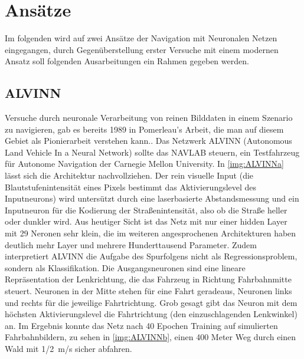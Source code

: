 \section{Ansätze}
Im folgenden wird auf zwei Ansätze der Navigation mit Neuronalen Netzen eingegangen, durch Gegenüberstellung erster Versuche mit einem modernen Ansatz soll folgenden Ausarbeitungen ein Rahmen gegeben werden.

\subsection{ALVINN}

Versuche durch neuronale Verarbeitung von reinen Bilddaten in einem Szenario zu navigieren, gab es bereits 1989 in Pomerleau's Arbeit, die man auf diesem Gebiet als Pionierarbeit verstehen kann.\cite{pomerleau1989alvinn}.
Das Netzwerk ALVINN (Autonomous Land Vehicle In a Neural Network) sollte das NAVLAB steuern, ein Testfahrzeug für Autonome Navigation der Carnegie Mellon University.
In \ref{img:ALVINNa} lässt sich die Architektur nachvollziehen. 
Der rein visuelle Input (die Blautstufenintensität eines Pixels bestimmt das Aktivierungslevel des Inputneurons) wird untersützt durch eine laserbasierte Abstandsmessung und ein Inputneuron für die Kodierung der \glqq Straßenintensität\grqq{}, also ob die Straße heller oder dunkler wird.
Aus heutiger Sicht ist das Netz mit nur einer hidden Layer mit 29 Neronen sehr klein, die im weiteren angesprochenen Architekturen haben deutlich mehr Layer und mehrere Hunderttausend Parameter. 
Zudem interpretiert ALVINN die Aufgabe des Spurfolgens nicht als Regressionsproblem, sondern als Klassifikation. Die Ausgangsneuronen sind eine lineare Repräsentation der Lenkrichtung, die das Fahrzeug in Richtung Fahrbahnmitte steuert. Neuronen in der Mitte stehen für eine Fahrt geradeaus, Neuronen links und rechts für die jeweilige Fahrtrichtung.
Grob gesagt gibt das Neuron mit dem höchsten Aktivierungslevel die Fahrtrichtung (den einzuschlagenden Lenkwinkel) an.
Im Ergebnis konnte das Netz nach 40 Epochen Training auf simulierten Fahrbahnbildern, zu sehen in \ref{img:ALVINNb}, einen 400 Meter Weg durch einen Wald mit \SI{1/2}{\meter/\second} sicher abfahren.


